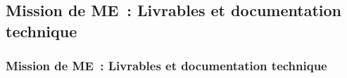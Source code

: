 \subsection{Mission de ME~: Livrables et documentation technique}
\begin{frame}
	\frametitle{Mission de ME~: Livrables et documentation technique}
\end{frame}

